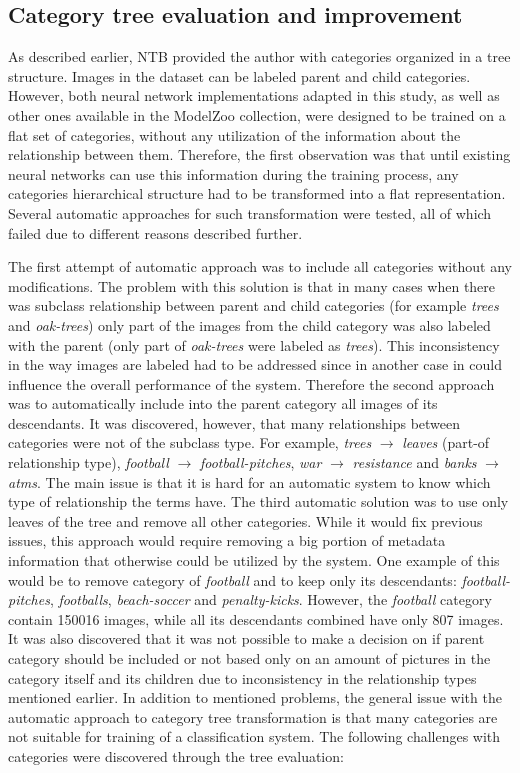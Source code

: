\subsection{Category tree evaluation and improvement}
    \label{sec:tree-eval}
    As described earlier, NTB provided the author with categories organized in a tree structure. Images in the dataset can be labeled parent and child categories. However, both neural network implementations adapted in this study, as well as other ones available in the ModelZoo \cite{CaffeModelZoo} collection, were designed to be trained on a flat set of categories, without any utilization of the information about the relationship between them. Therefore, the first observation was that until existing neural networks can use this information during the training process, any categories hierarchical structure had to be transformed into a flat representation. Several automatic approaches for such transformation were tested, all of which failed due to different reasons described further.
    
    The first attempt of automatic approach was to include all categories without any modifications. The problem with this solution is that in many cases when there was subclass relationship between parent and child categories (for example \textit{trees} and \textit{oak-trees}) only part of the images from the child category was also labeled with the parent (only part of \textit{oak-trees} were labeled as \textit{trees}). This inconsistency in the way images are labeled had to be addressed since in another case in could influence the overall performance of the system. Therefore the second approach was to automatically include into the parent category all images of its descendants. It was discovered, however, that many relationships between categories were not of the subclass type. For example, \textit{trees} $\rightarrow$ \textit{leaves} (part-of relationship type), \textit{football} $\rightarrow$ \textit{football-pitches}, \textit{war} $\rightarrow$ \textit{resistance} and \textit{banks} $\rightarrow$ \textit{atms}. The main issue is that it is hard for an automatic system to know which type of relationship the terms have. The third automatic solution was to use only leaves of the tree and remove all other categories. While it would fix previous issues, this approach would require removing a big portion of metadata information that otherwise could be utilized by the system. One example of this would be to remove category of \textit{football} and to keep only its descendants: \textit{football-pitches}, \textit{footballs}, \textit{beach-soccer} and \textit{penalty-kicks}. However, the \textit{football} category contain 150016 images, while all its descendants combined have only 807 images. It was also discovered that it was not possible to make a decision on if parent category should be included or not based only on an amount of pictures in the category itself and its children due to inconsistency in the relationship types mentioned earlier. In addition to mentioned problems, the general issue with the automatic approach to category tree transformation is that many categories are not suitable for training of a classification system. The following challenges with categories were discovered through the tree evaluation:
    
